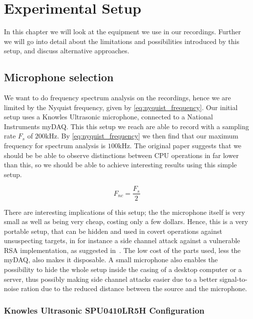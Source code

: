 \chapter{Experimental Setup}
In this chapter we will look at the equipment we use in our recordings.
Further we will go into detail about the limitations and possibilities introduced by this setup, and discuss alternative approaches.

\label{chp:experimental_setup} 

\section{Microphone selection}\label{ch3:sec:microphone_selection}

We want to do frequency spectrum analysis on the recordings, hence we are limited by the Nyquist frequency, given by \autoref{eq:nyquist_frequency}.
Our initial setup uses a Knowles Ultrasonic microphone, connected to a National Instruments myDAQ. 
This this setup we reach are able to record with a sampling rate \({F_{s}}\) of \(200\)kHz. 
By \autoref{eq:nyquist_frequency} we then find that our maximum frequency for spectrum analysis is \(100\)kHz.
The original paper  suggests that we should be be able to observe distinctions between CPU operations in far lower than this, so we should be able to achieve interesting results using this simple setup.

\begin{equation}\label{eq:nyquist_frequency}
F_{nc} = \frac{F_{s}}{2}
\end{equation}

There are interesting implications of this setup; the the microphone itself is very small as well as being very cheap, costing only a few dollars. 
Hence, this is a very portable setup, that can be hidden and used in covert operations against unsuspecting targets, in for instance a side channel attack against a vulnerable RSA implementation, as suggested in~\cite{DBLP:conf/crypto/GenkinST14}.
The low cost of the parts used, less the myDAQ, also makes it disposable.
A small microphone also enables the possibility to hide the whole setup inside the casing of a desktop computer or a server, thus possibly making side channel attacks easier due to a better signal-to-noise ration due to the reduced distance between the source and the microphone.

\subsection{Knowles Ultrasonic SPU0410LR5H Configuration}\label{ch3:sec:knowles_configuration}

